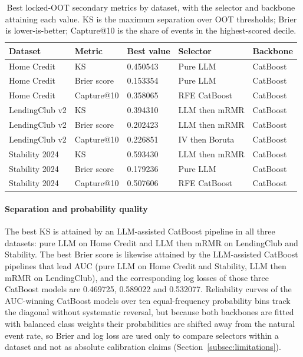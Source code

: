 \documentclass[preprint,12pt]{elsarticle}
\begin{document}
\begin{table}[htbp]
\centering
\footnotesize
\begin{threeparttable}
\caption{Best locked-OOT secondary metrics by dataset, with the selector and backbone attaining each value. KS is the maximum separation over OOT thresholds; Brier is lower-is-better; Capture@10 is the share of events in the highest-scored decile.}
\label{tab:secondary}
\begin{tabular}{@{}lllll@{}}
\toprule
Dataset & Metric & Best value & Selector & Backbone \\
\midrule
Home Credit & KS & 0.450543 & Pure LLM & CatBoost \\
Home Credit & Brier score & 0.153354 & Pure LLM & CatBoost \\
Home Credit & Capture@10 & 0.358065 & RFE CatBoost & CatBoost \\
LendingClub v2 & KS & 0.394310 & LLM then mRMR & CatBoost \\
LendingClub v2 & Brier score & 0.202423 & LLM then mRMR & CatBoost \\
LendingClub v2 & Capture@10 & 0.226851 & IV then Boruta & CatBoost \\
Stability 2024 & KS & 0.593430 & LLM then mRMR & CatBoost \\
Stability 2024 & Brier score & 0.179236 & Pure LLM & CatBoost \\
Stability 2024 & Capture@10 & 0.507606 & RFE CatBoost & CatBoost \\
\bottomrule
\end{tabular}
\end{threeparttable}
\end{table}

\paragraph{Separation and probability quality}
The best KS is attained by an LLM-assisted CatBoost pipeline in all three datasets: pure LLM on Home Credit and LLM then mRMR on LendingClub and Stability. The best Brier score is likewise attained by the LLM-assisted CatBoost pipelines that lead AUC (pure LLM on Home Credit and Stability, LLM then mRMR on LendingClub), and the corresponding log losses of those three CatBoost models are 0.469725, 0.589022 and 0.532077. Reliability curves of the AUC-winning CatBoost models over ten equal-frequency probability bins track the diagonal without systematic reversal, but because both backbones are fitted with balanced class weights their probabilities are shifted away from the natural event rate, so Brier and log loss are used only to compare selectors within a dataset and not as absolute calibration claims (Section~\ref{subsec:limitations}).
\end{document}
